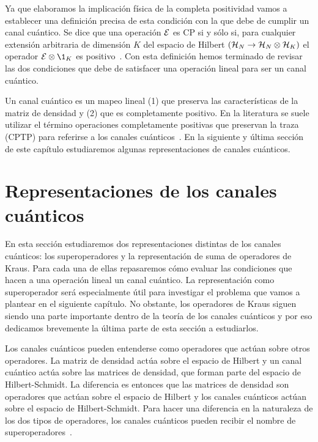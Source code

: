 Ya que elaboramos la implicación física de la completa positividad 
vamos a establecer una definición precisa de esta condición con la
que debe de cumplir un canal cuántico.
Se dice que una operación $\mathcal{E}$ es CP si 
y sólo si, para cualquier extensión arbitraria de dimensión $K$ 
del espacio de Hilbert $(\mathcal{H}_N \rightarrow \mathcal{H}_N \otimes \mathcal{H}_K)$ 
el operador $\E\otimes\1_K$ es positivo~\cite{bengtsson_zyczkowski_2017}. 
Con esta definición hemos terminado de revisar las dos condiciones que 
debe de satisfacer una operación lineal para ser un 
canal cuántico.

Un canal cuántico es un mapeo lineal  (1) que preserva las características
de la matriz de densidad y (2) que es completamente positivo. 
En la literatura se suele utilizar el término operaciones 
completamente positivas que preservan la traza 
(CPTP) para referirse a los canales 
cuánticos~\cite{bengtsson_zyczkowski_2017}. 
En la siguiente y última sección de este capítulo estudiaremos 
algunas representaciones de canales cuánticos. 
\section{Representaciones de los canales cuánticos} %
\label{sec:qtm-channels-representation}
En esta sección estudiaremos dos representaciones distintas de 
los canales cuánticos: los superoperadores y la representación 
de suma de operadores de Kraus. Para cada una de ellas repasaremos
cómo evaluar las condiciones que hacen a una operación lineal un 
canal cuántico. La representación como superoperador 
será especialmente útil para investigar el problema
que vamos a plantear en el siguiente capítulo. No obstante, los 
operadores de Kraus siguen siendo una parte importante dentro 
de la teoría de los canales cuánticos y por eso dedicamos brevemente
la última parte de esta sección a estudiarlos.

Los canales cuánticos pueden entenderse como operadores 
que actúan sobre otros operadores. 
La matriz de densidad actúa sobre 
el espacio de Hilbert y un canal cuántico actúa sobre las matrices de 
densidad, que forman parte del espacio de Hilbert-Schmidt. 
La diferencia es entonces que las matrices de densidad 
son operadores que actúan sobre el espacio de 
Hilbert y los canales cuánticos actúan sobre el espacio 
de Hilbert-Schmidt. Para hacer una diferencia en 
la naturaleza de los dos tipos de operadores, los canales cuánticos 
pueden recibir el nombre de superoperadores~\cite{preskill1998lecture}.

